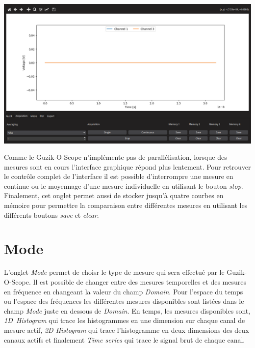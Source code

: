 \documentclass[openright,letterpaper,12pt]{book}
\begin{document}
\begin{center}
		\includegraphics[width=\textwidth]{Figures/Acquisition.png}
\end{center}\vspace{1cm}

Comme le Guzik-O-Scope n'implémente pas de parallélisation, lorsque des mesures 
sont en cours l'interface graphique répond plus lentement. 
Pour retrouver le contrôle complet de l'interface il est possible d'interrompre 
une mesure en continue ou le moyennage d'une mesure individuelle en utilisant 
le bouton \textit{stop}.
Finalement, cet onglet permet aussi de stocker jusqu'à quatre courbes en 
mémoire pour permettre la comparaison entre différentes mesures en utilisant 
les différents boutons \textit{save} et \textit{clear}.\clearpage

\section*{Mode}\vspace{1cm}

L'onglet \textit{Mode} permet de choisr le type de mesure qui sera effectué par 
le Guzik-O-Scope. 
Il est possible de changer entre des mesures temporelles et des mesures en 
fréquence en changeant la valeur du champ \textit{Domain}. 
Pour l'espace du temps ou l'espace des fréquences les différentes mesures 
disponibles sont listées dans le champ \textit{Mode} juste en dessous de 
\textit{Domain}. 
En temps, les mesures disponibles sont, \textit{1D~Histogram} qui trace les 
histogrammes en une dimension sur chaque canal de mesure actif, 
\textit{2D Histogram} qui trace l'histogramme en deux dimensions des deux 
canaux actifs et finalement \textit{Time series} qui trace le signal brut de 
chaque canal.\vspace{1cm}
\end{document}
